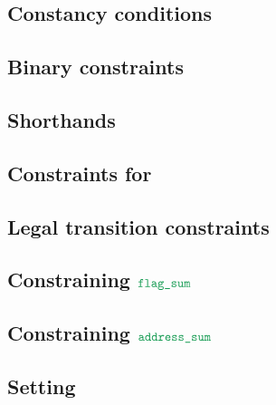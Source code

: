 \subsection{Constancy conditions                           }    \label{bls: generalities: constancy conditions}                %
\subsection{Binary constraints                             }    \label{bls: generalities: binary}                              %
\subsection{Shorthands                                     }    \label{bls: generalities: shorthands}                          %
\subsection{Constraints for \blsStamp{}                    }    \label{bls: generalities: stamp}                               %
\subsection{Legal transition constraints                   }    \label{bls: generalities: legal transitions}                   %
\subsection{Constraining $\locFlagSum$                     }    \label{bls: generalities: flag sum}                            %
\subsection{Constraining $\locAddressSum$                  }    \label{bls: generalities: address sum}                         %
\subsection{Setting \blsPhase{}                            }    \label{bls: generalities: setting phase}                       %
